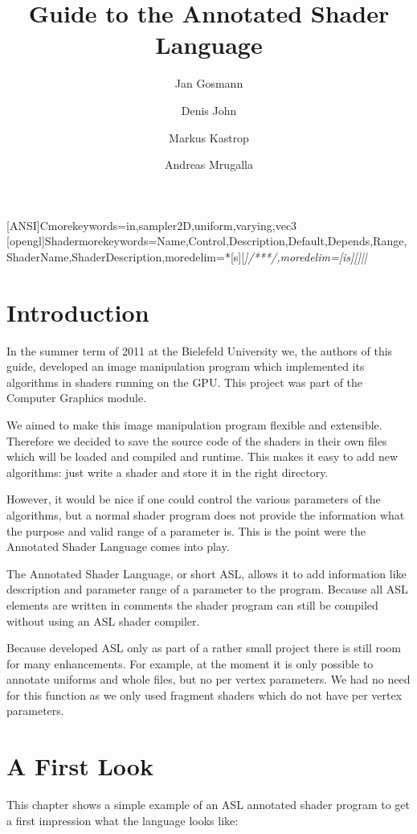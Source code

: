 \documentclass[11pt,a4paper]{scrreprt}
\title{Guide to the Annotated Shader Language}
\author{Jan Gosmann \and Denis John \and Markus Kastrop \and Andreas Mrugalla}
\begin{document}
[ANSI]{C}{morekeywords={in,sampler2D,uniform,varying,vec3}}
[opengl]{Shader}{morekeywords={Name,Control,Description,Default,Depends,Range,ShaderName,ShaderDescription},moredelim=*[s][\itshape]{/**}{*/},moredelim=[is][\itshape]{|}{|}}
\maketitle
\tableofcontents

\chapter{Introduction}
In the summer term of 2011 at the Bielefeld University we, the authors of this 
guide, developed an image manipulation program which implemented its algorithms 
in shaders running on the GPU. This project was part of the Computer Graphics 
module.

We aimed to make this image manipulation program flexible and extensible.  
Therefore we decided to save the source code of the shaders in their own files 
which will be loaded and compiled and runtime. This makes it easy to add new 
algorithms: just write a shader and store it in the right directory.

However, it would be nice if one could control the various parameters of the 
algorithms, but a normal shader program does not provide the information what 
the purpose and valid range of a parameter is. This is the point were the 
Annotated Shader Language comes into play.

The Annotated Shader Language, or short ASL, allows it to add information like 
description and parameter range of a parameter to the program. Because all ASL 
elements are written in comments the shader program can still be compiled 
without using an ASL shader compiler.

Because developed ASL only as part of a rather small project there is still room 
for many enhancements. For example, at the moment it is only possible to 
annotate uniforms and whole files, but no per vertex parameters. We had no need 
for this function as we only used fragment shaders which do not have per vertex 
parameters.


\chapter{A First Look}
This chapter shows a simple example of an ASL annotated shader program to get 
a first impression what the language looks like:
\end{document}
